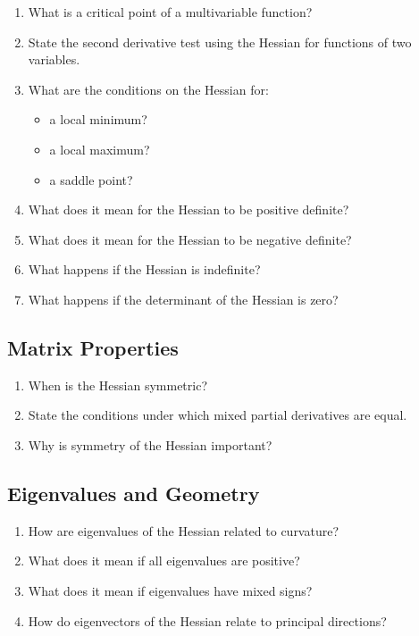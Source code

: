 \begin{enumerate}[resume]
  \item What is a critical point of a multivariable function?
  \item State the second derivative test using the Hessian for functions of two variables.
  \item What are the conditions on the Hessian for:
    \begin{itemize}
      \item a local minimum?
      \item a local maximum?
      \item a saddle point?
    \end{itemize}
  \item What does it mean for the Hessian to be positive definite?
  \item What does it mean for the Hessian to be negative definite?
  \item What happens if the Hessian is indefinite?
  \item What happens if the determinant of the Hessian is zero?
\end{enumerate}

\subsection{Matrix Properties}

\begin{enumerate}[resume]
  \item When is the Hessian symmetric?
  \item State the conditions under which mixed partial derivatives are equal.
  \item Why is symmetry of the Hessian important?
\end{enumerate}

\subsection{Eigenvalues and Geometry}

\begin{enumerate}[resume]
  \item How are eigenvalues of the Hessian related to curvature?
  \item What does it mean if all eigenvalues are positive?
  \item What does it mean if eigenvalues have mixed signs?
  \item How do eigenvectors of the Hessian relate to principal directions?
\end{enumerate}

